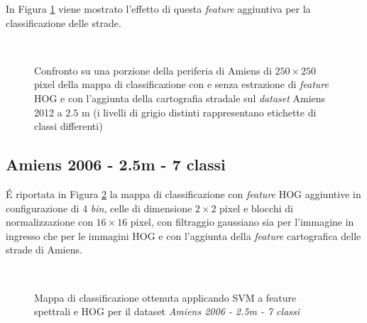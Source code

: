 In Figura \ref{fig:confrontoAmiens2012_2_5m} viene mostrato l'effetto
di questa \emph{feature} aggiuntiva per la classificazione delle
strade.


\begin{figure}[!ht]
\center
{}
\hspace{3mm}
\\
\caption{Confronto su una porzione della periferia di Amiens di
$250\times250$ pixel della mappa di classificazione con e senza
estrazione di \emph{feature} HOG e con l'aggiunta della cartografia
stradale sul \emph{dataset} Amiens 2012 a $2.5$ m (i livelli di grigio distinti rappresentano etichette di classi differenti)}
\label{fig:confrontoAmiens2012_2_5m}
\end{figure}

\clearpage

\subsection{Amiens 2006 - 2.5m - 7 classi}

\'E riportata in Figura \ref{fig:ClassMap_Amiens2006_2_5m_roadsandhog}
la mappa di classificazione con \emph{feature} HOG aggiuntive in
configurazione di $4$ \emph{bin}, celle di dimensione $2\times2$
pixel e blocchi di normalizzazione con $16\times16$ pixel, con
filtraggio gaussiano sia per l'immagine in ingresso che per le
immagini HOG e con l'aggiunta della \emph{feature} cartografica delle
strade di Amiens.

\begin{figure}[!ht]

\center
{}
\\
\caption{Mappa di classificazione ottenuta applicando SVM a feature spettrali e HOG per il dataset \emph{Amiens 2006 - 2.5m
- 7 classi}}
\label{fig:ClassMap_Amiens2006_2_5m_roadsandhog}

\end{figure}

